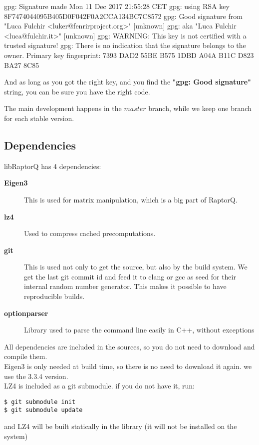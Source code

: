 \documentclass[11pt,a4paper]{refart}
\begin{document}
\begin{verbbox}[\footnotesize]
 gpg: Signature made Mon 11 Dec 2017 21:55:28 CET
 gpg:                using RSA key 8F7474044095B405D0F042F0A2CCA134BC7C8572
 gpg: Good signature from "Luca Fulchir <luker@fenrirproject.org>" [unknown]
 gpg:                 aka "Luca Fulchir <luca@fulchir.it>" [unknown]
 gpg: WARNING: This key is not certified with a trusted signature!
 gpg:          There is no indication that the signature belongs to the owner.
 Primary key fingerprint: 7393 DAD2 55BE B575 1DBD A04A B11C D823 BA27 8C85
\end{verbbox}
\theverbbox

And as long as you got the right key, and you find the \textbf{"gpg: Good signature"} string,
you can be sure you have the right code.

The main development happens in the $master$ branch, while we keep one branch for each stable version.


\subsection{Dependencies}

libRaptorQ has 4 dependencies:
\begin{description}
\item[\textbf{Eigen3}] This is used for matrix manipulation, which is a big part of RaptorQ.
\item[\textbf{lz4}] Used to compress cached precomputations.
\item[\textbf{git}] This is used not only to get the source, but also by the build system. We get the last git commit id and feed it to clang or gcc as seed for their internal random number generator. This makes it possible to have reproducible builds.

\item[\textbf{optionparser}] Library used to parse the command line easily in C++, without exceptions
\end{description}

All dependencies are included in the sources, so you do not need to download and compile them.\\
Eigen3 is only needed at build time, so there is no need to download it again. we use the 3.3.4 version.\\
LZ4 is included as a git submodule. if you do not have it, run:
\begin{verbatim}
$ git submodule init
$ git submodule update
\end{verbatim}
and LZ4 will be built statically in the library (it will not be installed on the system)
\end{document}
